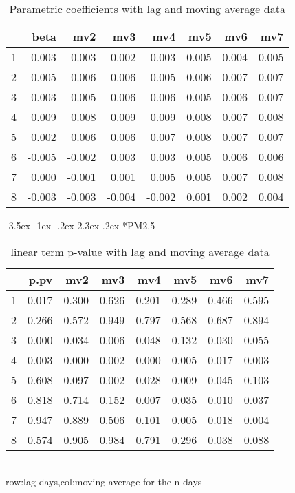 \documentclass[a4paper, 12pt]{article}
\makeatletter
\def\large{\fontsize{14}{20}\selectfont}
\renewcommand\subsection{\@startsection {subsection}{1}{\z@}%
                                   {-3.5ex \@plus -1ex \@minus -.2ex}%
                                   {2.3ex \@plus.2ex}%
                                   {\centering\normalfont\large\bfseries}}
\makeatother
\begin{document}
\begin{table}[h]
\centering
\caption{Parametric coefficients with lag and moving average data}
\begin{tabular}{rrrrrrrr}
  \hline
 & beta & mv2 & mv3 & mv4 & mv5 & mv6 & mv7 \\
  \hline
1 & 0.003 & 0.003 & 0.002 & 0.003 & 0.005 & 0.004 & 0.005 \\
  2 & 0.005 & 0.006 & 0.006 & 0.005 & 0.006 & 0.007 & 0.007 \\
  3 & 0.003 & 0.005 & 0.006 & 0.006 & 0.005 & 0.006 & 0.007 \\
  4 & 0.009 & 0.008 & 0.009 & 0.009 & 0.008 & 0.007 & 0.008 \\
  5 & 0.002 & 0.006 & 0.006 & 0.007 & 0.008 & 0.007 & 0.007 \\
  6 & -0.005 & -0.002 & 0.003 & 0.003 & 0.005 & 0.006 & 0.006 \\
  7 & 0.000 & -0.001 & 0.001 & 0.005 & 0.005 & 0.007 & 0.008 \\
  8 & -0.003 & -0.003 & -0.004 & -0.002 & 0.001 & 0.002 & 0.004 \\
   \hline
\end{tabular}
\end{table}
\clearpage
\subsection*{PM2.5}
\begin{table}[h]
\centering
\caption{linear term p-value with lag and moving average data}
\begin{tabular}{rrrrrrrr}
  \hline
 & p.pv & mv2 & mv3 & mv4 & mv5 & mv6 & mv7 \\
  \hline
1 & 0.017 & 0.300 & 0.626 & 0.201 & 0.289 & 0.466 & 0.595 \\
  2 & 0.266 & 0.572 & 0.949 & 0.797 & 0.568 & 0.687 & 0.894 \\
  3 & 0.000 & 0.034 & 0.006 & 0.048 & 0.132 & 0.030 & 0.055 \\
  4 & 0.003 & 0.000 & 0.002 & 0.000 & 0.005 & 0.017 & 0.003 \\
  5 & 0.608 & 0.097 & 0.002 & 0.028 & 0.009 & 0.045 & 0.103 \\
  6 & 0.818 & 0.714 & 0.152 & 0.007 & 0.035 & 0.010 & 0.037 \\
  7 & 0.947 & 0.889 & 0.506 & 0.101 & 0.005 & 0.018 & 0.004 \\
  8 & 0.574 & 0.905 & 0.984 & 0.791 & 0.296 & 0.038 & 0.088 \\
   \hline
\end{tabular}
\\row:lag days,col:moving average for the n days
\end{table}
\end{document}
